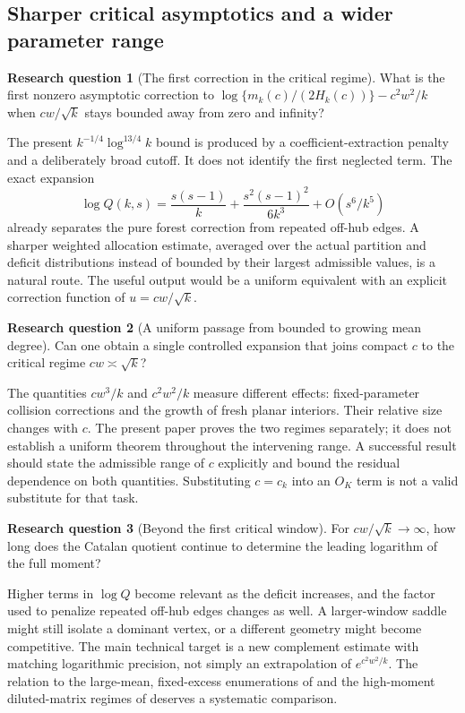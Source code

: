 \documentclass[11pt,letterpaper]{article}
\theoremstyle{remark}\newtheorem{remark}[theorem]{Remark}
\theoremstyle{definition}\newtheorem{definition}[theorem]{Definition}
\newtheorem{question}{Research question}[section]\theoremstyle{plain}
\begin{document}
\subsection{Sharper critical asymptotics and a wider parameter range}

\begin{question}[The first correction in the critical regime]\label{sgm:md:q:critcorr}
What is the first nonzero asymptotic correction to
$\log\{m_k(c)/(2H_k(c))\}-c^2w^2/k$ when $cw/\sqrt{k}$ stays bounded
away from zero and infinity?
\end{question}
The present $k^{-1/4}\log^{13/4}k$ bound is produced by a
coefficient-extraction penalty and a deliberately broad cutoff. It
does not identify the first neglected term. The exact expansion
\[
 \log Q(k,s)=\frac{s(s-1)}k
 +\frac{s^2(s-1)^2}{6k^3}+O(s^6/k^5)
\]
already separates the pure forest correction from repeated off-hub
edges. A sharper weighted allocation estimate, averaged over the
actual partition and deficit distributions instead of bounded by
their largest admissible values, is a natural route. The useful
output would be a uniform equivalent with an explicit correction
function of $u=cw/\sqrt{k}$.

\begin{question}[A uniform passage from bounded to growing mean degree]\label{sgm:md:q:uniform}
Can one obtain a single controlled expansion that joins compact
$c$ to the critical regime $cw\asymp\sqrt{k}$?
\end{question}
The quantities $cw^3/k$ and $c^2w^2/k$ measure different effects:
fixed-parameter collision corrections and the growth of fresh
planar interiors. Their relative size changes with $c$. The present
paper proves the two regimes separately; it does not establish a
uniform theorem throughout the intervening range. A successful
result should state the admissible range of $c$ explicitly and
bound the residual dependence on both quantities. Substituting
$c=c_k$ into an $O_K$ term is not a valid substitute for that task.

\begin{question}[Beyond the first critical window]\label{sgm:md:q:beyond}
For $cw/\sqrt{k}\to\infty$, how long does the Catalan quotient
continue to determine the leading logarithm of the full moment?
\end{question}
Higher terms in $\log Q$ become relevant as the deficit increases,
and the factor used to penalize repeated off-hub edges changes as
well. A larger-window saddle might still isolate a dominant vertex,
or a different geometry might become competitive. The main technical
target is a new complement estimate with matching logarithmic
precision, not simply an extrapolation of $e^{c^2w^2/k}$. The relation
to the large-mean, fixed-excess enumerations of
\cite{hdp} and the high-moment diluted-matrix regimes of
\cite{khor1} deserves a systematic comparison.
\end{document}
